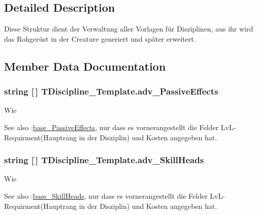 \subsection{Detailed Description}
Diese Struktur dient der Verwaltung aller Vorlagen für Disziplinen, aus ihr wird das Rohgerüst in der Creature generiert und später erweitert. 

\subsection{Member Data Documentation}
\hypertarget{struct_t_discipline___template_a1e6c01aeec904a02d565947aa2b1d0ba}{}
\subsubsection[{adv\+\_\+\+Passive\+Effects}]{\setlength{\rightskip}{0pt plus 5cm}string \mbox{[}$\,$\mbox{]} T\+Discipline\+\_\+\+Template.\+adv\+\_\+\+Passive\+Effects}\label{struct_t_discipline___template_a1e6c01aeec904a02d565947aa2b1d0ba}
Wie \begin{DoxySeeAlso}{See also}
\+:\hyperlink{struct_t_discipline___template_afa71992d7f467f7eaa7f1f4d0dc7d05e}{base\+\_\+\+Passive\+Effects}, nur dass es vornerangestellt die Felder Lv\+L-\/\+Requirment(Hauptrang in der Disziplin) und Kosten angegeben hat. 
\end{DoxySeeAlso}
\hypertarget{struct_t_discipline___template_a1975713cc5f1b6d530c96590762bead9}{}
\subsubsection[{adv\+\_\+\+Skill\+Heads}]{\setlength{\rightskip}{0pt plus 5cm}string \mbox{[}$\,$\mbox{]} T\+Discipline\+\_\+\+Template.\+adv\+\_\+\+Skill\+Heads}\label{struct_t_discipline___template_a1975713cc5f1b6d530c96590762bead9}
Wie \begin{DoxySeeAlso}{See also}
\+:\hyperlink{struct_t_discipline___template_aec2a4f16caf01c371224b0f67059cb74}{base\+\_\+\+Skill\+Heads}, nur dass es vornerangestellt die Felder Lv\+L-\/\+Requirment(Hauptrang in der Disziplin) und Kosten angegeben hat. 
\end{DoxySeeAlso}
\hypertarget{struct_t_discipline___template_ada6372f9138e4a582b84926fcd631c93}{}
